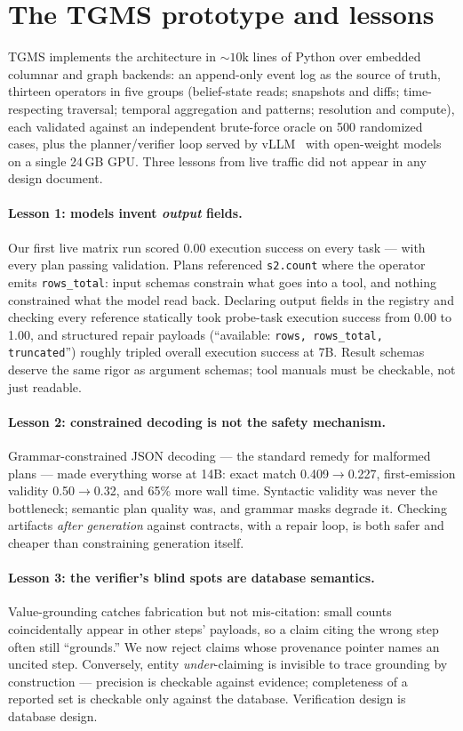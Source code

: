 \documentclass[sigconf]{acmart}
\begin{document}
\section{The TGMS prototype and lessons}
\label{sec:lessons}

TGMS implements the architecture in ${\sim}10$k lines of Python over
embedded columnar and graph backends: an append-only event log as the
source of truth, thirteen operators in five groups (belief-state reads;
snapshots and diffs; time-respecting traversal; temporal aggregation and
patterns; resolution and compute), each validated against an independent
brute-force oracle on 500 randomized cases, plus the planner/verifier
loop served by vLLM~\cite{kwon2023vllm} with open-weight
models~\cite{qwen25} on a single 24\,GB GPU. Three lessons from live
traffic did not appear in any design document.

\paragraph{Lesson 1: models invent \emph{output} fields.}
Our first live matrix run scored 0.00 execution success on every task
--- with every plan passing validation. Plans referenced
\texttt{s2.count} where the operator emits \texttt{rows\_total}: input
schemas constrain what goes into a tool, and nothing constrained what
the model read back. Declaring output fields in the registry and
checking every reference statically took probe-task execution success
from 0.00 to 1.00, and structured repair payloads (``available:
\texttt{rows, rows\_total, truncated}'') roughly tripled overall
execution success at 7B. Result schemas deserve the same rigor as
argument schemas; tool manuals must be checkable, not just readable.

\paragraph{Lesson 2: constrained decoding is not the safety
mechanism.} Grammar-constrained JSON decoding --- the standard remedy
for malformed plans --- made everything worse at 14B: exact match
0.409${\to}$0.227, first-emission validity 0.50${\to}$0.32, and 65\%
more wall time. Syntactic validity was never the bottleneck; semantic
plan quality was, and grammar masks degrade it. Checking artifacts
\emph{after generation} against contracts, with a repair loop, is both
safer and cheaper than constraining generation itself.

\paragraph{Lesson 3: the verifier's blind spots are database
semantics.} Value-grounding catches fabrication but not mis-citation:
small counts coincidentally appear in other steps' payloads, so a claim
citing the wrong step often still ``grounds.'' We now reject claims
whose provenance pointer names an uncited step. Conversely, entity
\emph{under}-claiming is invisible to trace grounding by construction
--- precision is checkable against evidence; completeness of a reported
set is checkable only against the database. Verification design is
database design.
\end{document}
